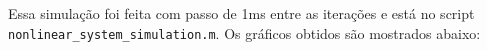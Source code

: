 \documentclass[12pt]{article}
\begin{document}
    Essa simulação foi feita com passo de 1ms entre as iterações e está no script \\
    \texttt{nonlinear\_system\_simulation.m}. Os gráficos obtidos são mostrados abaixo:
    \begin{figure}[H]
         \qquad
         \par       
         \qquad

\end{figure}
\end{document}
